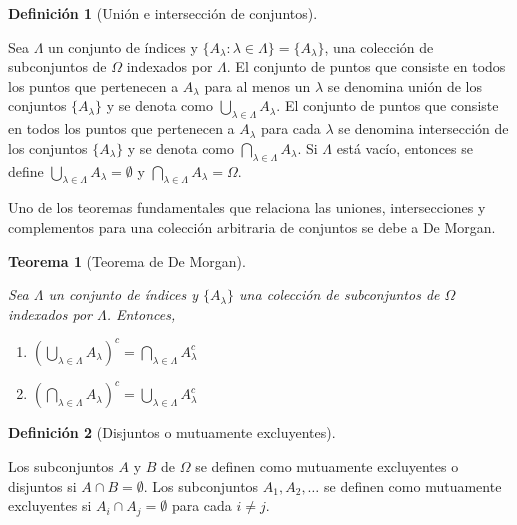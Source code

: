 \documentclass[
  us-letterpaper,
]{scrreprt}
\theoremstyle{plain}
\newtheorem{theorem}{Teorema}[chapter]
\theoremstyle{definition}
\newtheorem{definition}{Definición}[chapter]
\theoremstyle{definition}
\theoremstyle{plain}
\theoremstyle{remark}
\begin{document}
\begin{definition}[Unión e intersección de
conjuntos]\protect\hypertarget{def-UI}{}\label{def-UI}

Sea \(\Lambda\) un conjunto de índices y
\(\{A_\lambda: \lambda \in \Lambda\}= \{A_\lambda\}\), una colección de
subconjuntos de \(\Omega\) indexados por \(\Lambda\). El conjunto de
puntos que consiste en todos los puntos que pertenecen a \(A_\lambda\)
para al menos un \(\lambda\) se denomina unión de los conjuntos
\(\{A_\lambda\}\) y se denota como
\(\bigcup\limits_{\lambda\in \Lambda} A_\lambda\). El conjunto de puntos
que consiste en todos los puntos que pertenecen a \(A_\lambda\) para
cada \(\lambda\) se denomina intersección de los conjuntos
\(\{A_\lambda\}\) y se denota como
\(\bigcap\limits_{\lambda\in\Lambda} A_\lambda\). Si \(\Lambda\) está
vacío, entonces se define
\(\bigcup\limits_{\lambda\in \Lambda} A_\lambda = \emptyset\) y
\(\bigcap\limits_{\lambda\in\Lambda} A_\lambda=\Omega\).

\end{definition}

Uno de los teoremas fundamentales que relaciona las uniones,
intersecciones y complementos para una colección arbitraria de conjuntos
se debe a De Morgan.

\begin{theorem}[Teorema de De
Morgan]\protect\hypertarget{thm-morgan}{}\label{thm-morgan}

Sea \(\Lambda\) un conjunto de índices y \(\{A_\lambda\}\) una colección
de subconjuntos de \(\Omega\) indexados por \(\Lambda\). Entonces,

\begin{enumerate}
\def\labelenumi{\roman{enumi}.}
\item
  \(\left(\bigcup\limits_{\lambda\in\Lambda} A_\lambda\right)^c = \bigcap\limits_{\lambda\in\Lambda} A_\lambda^c\)
\item
  \(\left(\bigcap\limits_{\lambda\in\Lambda} A_\lambda\right)^c = \bigcup\limits_{\lambda\in\Lambda} A_\lambda^c\)
\end{enumerate}

\end{theorem}

\begin{definition}[Disjuntos o mutuamente
excluyentes]\protect\hypertarget{def-disjunto}{}\label{def-disjunto}

Los subconjuntos \(A\) y \(B\) de \(\Omega\) se definen como mutuamente
excluyentes o disjuntos si \(A\cap B=\emptyset\). Los subconjuntos
\(A_1, A_2, \ldots\) se definen como mutuamente excluyentes si
\(A_i\cap A_j=\emptyset\) para cada \(i\neq j\).

\end{definition}
\end{document}
